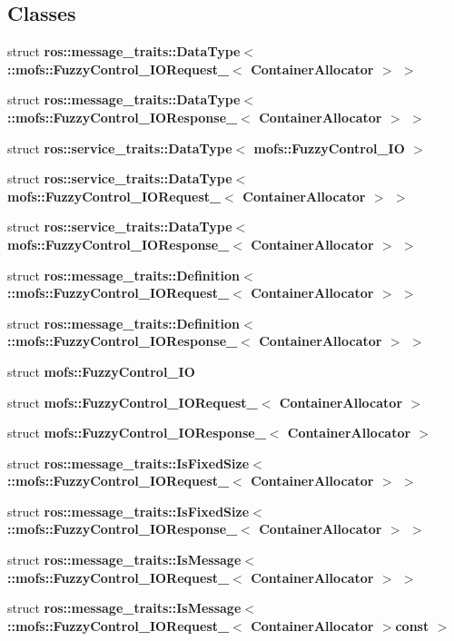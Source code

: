 \subsection*{Classes}
\begin{DoxyCompactItemize}
\item 
struct {\bf ros\-::message\-\_\-traits\-::\-Data\-Type$<$ \-::mofs\-::\-Fuzzy\-Control\-\_\-\-I\-O\-Request\-\_\-$<$ Container\-Allocator $>$ $>$}
\item 
struct {\bf ros\-::message\-\_\-traits\-::\-Data\-Type$<$ \-::mofs\-::\-Fuzzy\-Control\-\_\-\-I\-O\-Response\-\_\-$<$ Container\-Allocator $>$ $>$}
\item 
struct {\bf ros\-::service\-\_\-traits\-::\-Data\-Type$<$ mofs\-::\-Fuzzy\-Control\-\_\-\-I\-O $>$}
\item 
struct {\bf ros\-::service\-\_\-traits\-::\-Data\-Type$<$ mofs\-::\-Fuzzy\-Control\-\_\-\-I\-O\-Request\-\_\-$<$ Container\-Allocator $>$ $>$}
\item 
struct {\bf ros\-::service\-\_\-traits\-::\-Data\-Type$<$ mofs\-::\-Fuzzy\-Control\-\_\-\-I\-O\-Response\-\_\-$<$ Container\-Allocator $>$ $>$}
\item 
struct {\bf ros\-::message\-\_\-traits\-::\-Definition$<$ \-::mofs\-::\-Fuzzy\-Control\-\_\-\-I\-O\-Request\-\_\-$<$ Container\-Allocator $>$ $>$}
\item 
struct {\bf ros\-::message\-\_\-traits\-::\-Definition$<$ \-::mofs\-::\-Fuzzy\-Control\-\_\-\-I\-O\-Response\-\_\-$<$ Container\-Allocator $>$ $>$}
\item 
struct {\bf mofs\-::\-Fuzzy\-Control\-\_\-\-I\-O}
\item 
struct {\bf mofs\-::\-Fuzzy\-Control\-\_\-\-I\-O\-Request\-\_\-$<$ Container\-Allocator $>$}
\item 
struct {\bf mofs\-::\-Fuzzy\-Control\-\_\-\-I\-O\-Response\-\_\-$<$ Container\-Allocator $>$}
\item 
struct {\bf ros\-::message\-\_\-traits\-::\-Is\-Fixed\-Size$<$ \-::mofs\-::\-Fuzzy\-Control\-\_\-\-I\-O\-Request\-\_\-$<$ Container\-Allocator $>$ $>$}
\item 
struct {\bf ros\-::message\-\_\-traits\-::\-Is\-Fixed\-Size$<$ \-::mofs\-::\-Fuzzy\-Control\-\_\-\-I\-O\-Response\-\_\-$<$ Container\-Allocator $>$ $>$}
\item 
struct {\bf ros\-::message\-\_\-traits\-::\-Is\-Message$<$ \-::mofs\-::\-Fuzzy\-Control\-\_\-\-I\-O\-Request\-\_\-$<$ Container\-Allocator $>$ $>$}
\item 
struct {\bf ros\-::message\-\_\-traits\-::\-Is\-Message$<$ \-::mofs\-::\-Fuzzy\-Control\-\_\-\-I\-O\-Request\-\_\-$<$ Container\-Allocator $>$const  $>$}

\end{DoxyCompactItemize}
